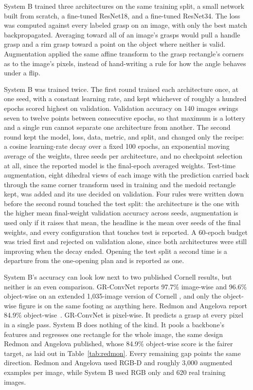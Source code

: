 \documentclass[12pt,letterpaper]{article}
\begin{document}
System B trained three architectures on the same training split, a
small network built from scratch, a fine-tuned ResNet18, and a
fine-tuned ResNet34. The loss was computed against every labeled grasp
on an image, with only the best match backpropagated. Averaging toward
all of an image's grasps would pull a handle grasp and a rim grasp
toward a point on the object where neither is valid. Augmentation
applied the same affine transform to the grasp rectangle's corners as
to the image's pixels, instead of hand-writing a rule for how the
angle behaves under a flip.

System B was trained twice. The first round trained each architecture
once, at one seed, with a constant learning rate, and kept whichever of
roughly a hundred epochs scored highest on validation. Validation
accuracy on 140 images swings seven to twelve points between
consecutive epochs, so that maximum is a lottery and a single run
cannot separate one architecture from another. The second round kept
the model, loss, data, metric, and split, and changed only the recipe:
a cosine learning-rate decay over a fixed 100 epochs, an exponential
moving average of the weights, three seeds per architecture, and no
checkpoint selection at all, since the reported model is the
final-epoch averaged weights. Test-time augmentation, eight dihedral
views of each image with the prediction carried back through the same
corner transform used in training and the medoid rectangle kept, was
added and its use decided on validation. Four rules were written down
before the second round touched the test split: the architecture is
the one with the higher mean final-weight validation accuracy across
seeds, augmentation is used only if it raises that mean, the headline
is the mean over seeds of the final weights, and every configuration
that touches test is reported. A 60-epoch budget was tried first and
rejected on validation alone, since both architectures were still
improving when the decay ended. Opening the test split a second time
is a departure from the one-opening plan and is reported as one.

System B's accuracy can look low next to two published Cornell results,
but neither is an even comparison. GR-ConvNet reports 97.7\% image-wise
and 96.6\% object-wise on an extended 1,035-image version of Cornell
\cite{kumra2020}, and only the object-wise figure is on the same
footing as anything here. Redmon and Angelova report 84.9\%
object-wise~\cite{redmon2015}. GR-ConvNet is pixel-wise. It predicts a grasp at
every pixel in a single pass. System B does nothing of the kind. It
pools a backbone's features and regresses one rectangle for the whole
image, the same design Redmon and Angelova published, whose 84.9\%
object-wise score is the fairer target, as laid out in
Table~\ref{tab:redmon}. Every remaining gap points the same direction.
Redmon and Angelova used RGB-D and roughly 3,000 augmented examples per
image, while System B used RGB only and 620 real training images.
\end{document}
